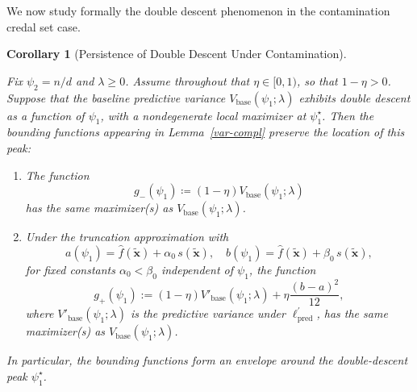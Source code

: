 \documentclass[12pt, english, oneside, a4paper]{article}
\newtheorem{theorem}{Theorem}%
\newtheorem{corollary}{Corollary}[theorem]
\begin{document}

We now study formally the double descent phenomenon in the contamination credal set case.

\begin{corollary}[Persistence of Double Descent Under Contamination]
\label{cor:robust-dd-variance}

Fix $\psi_2 = n/d$ and $\lambda \ge 0$. Assume throughout that $\eta\in[0,1)$, so that $1-\eta>0$. Suppose that the baseline predictive variance $V_{\mathrm{base}}(\psi_1;\lambda)$ exhibits double descent as a function of $\psi_1$, with a nondegenerate local maximizer at $\psi_1^\star$.
Then the bounding functions appearing in Lemma~\ref{var-compl} preserve the location of this peak:

\begin{enumerate}
\item The function
\[
g_-(\psi_1)
\coloneqq
(1-\eta) V_{\mathrm{base}}(\psi_1;\lambda)
\]
has the same maximizer(s) as $V_{\mathrm{base}}(\psi_1;\lambda)$.

\item Under the truncation approximation with
\[
a(\psi_1)=\hat{f}(\tilde{\mathbf{x}})+\alpha_0\,s(\tilde{\mathbf{x}}),
\quad
b(\psi_1)=\hat{f}(\tilde{\mathbf{x}})+\beta_0\,s(\tilde{\mathbf{x}}),
\]
for fixed constants $\alpha_0<\beta_0$ independent of $\psi_1$, the function
\[
g_+(\psi_1):=(1-\eta)V'_{\mathrm{base}}(\psi_1;\lambda)+\eta\frac{(b-a)^2}{12},
\]
where $V'_{\mathrm{base}}(\psi_1;\lambda)$ is the predictive variance under
$\ell^\prime_{\mathrm{pred}}$, has the same maximizer(s) as $V_{\mathrm{base}}(\psi_1;\lambda)$.
\end{enumerate}

In particular, the bounding functions form an envelope around the double-descent peak $\psi_1^\star$.
\end{corollary}
\end{document}
